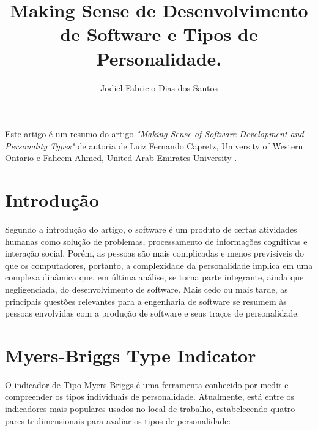 \documentclass[12pt]{article}
\title{Making Sense de Desenvolvimento de Software e Tipos de Personalidade.}
\author{Jodiel Fabricio Dias dos Santos\inst{1} }
\begin{document}
 

\maketitle

\begin{resumo} 
  Este artigo é um resumo do artigo \textit{"Making Sense of Software Development and Personality Types"} de autoria de Luiz Fernando Capretz, University of Western Ontario  e Faheem Ahmed, United Arab Emirates University \cite{capretz:2010}.
\end{resumo}


\section{Introdução}

Segundo a introdução do artigo, o software é um produto de certas atividades humanas como solução de problemas, processamento de informações cognitivas e interação social. Porém, as pessoas são mais complicadas e menos previsíveis do que os computadores, portanto, a complexidade da personalidade implica em uma complexa dinâmica que, em última análise, se torna parte integrante, ainda que negligenciada, do desenvolvimento de software.
Mais cedo ou mais tarde, as principais questões relevantes para a engenharia de software se resumem às pessoas envolvidas com a produção de software e seus traços de personalidade.


\section{Myers-Briggs Type Indicator } \label{sec:firstpage}

O indicador de Tipo Myers-Briggs  é uma ferramenta conhecido por medir e  compreender os tipos individuais de personalidade. Atualmente, está entre os indicadores mais populares usados no local de trabalho, estabelecendo quatro pares tridimensionais para avaliar os tipos de personalidade: 
\end{document}
